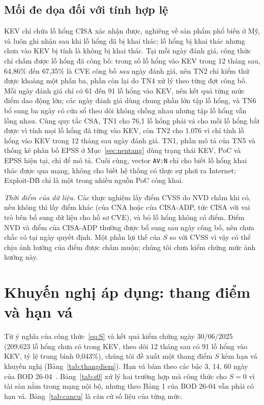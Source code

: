 \documentclass[conference]{IEEEtran}
\begin{document}
\subsection{Mối đe dọa đối với tính hợp lệ}
KEV chỉ chứa lỗ hổng CISA xác nhận được, nghiêng về sản phẩm phổ biến ở Mỹ, và luôn ghi nhận sau khi
lỗ hổng đã bị khai thác; lỗ hổng bị khai thác nhưng chưa vào KEV bị tính là không bị khai thác. Tại
mỗi ngày đánh giá, công thức chỉ chấm được lỗ hổng đã công bố: trong số lỗ hổng vào KEV trong 12
tháng sau, 64,86\% đến 67,35\% là CVE công bố \emph{sau} ngày đánh giá, nên TN2 chỉ kiểm thử được khoảng
một phần ba, phần còn lại do TN4 xử lý theo từng đợt công bố. Mỗi ngày đánh giá chỉ có 61 đến 91 lỗ
hổng vào KEV, nên kết quả từng mức điểm dao động lớn; các ngày đánh giá dùng chung phần lớn tập lỗ
hổng, và TN6 bổ sung ba ngày có cửa sổ theo dõi không chồng nhau nhưng tập lỗ hổng vẫn lồng nhau.
Cùng quy tắc CSA, TN1 cho 76,1 lỗ hổng phải vá cho mỗi lỗ hổng bắt được vì tính mọi lỗ hổng đã từng
vào KEV, còn TN2 cho 1.076 vì chỉ tính lỗ hổng vào KEV trong 12 tháng sau ngày đánh giá. TN1, phần mô
tả của TN5 và thống kê phân bố EPSS ở Mục~\ref{sec:nentang} dùng trạng thái KEV, PoC và EPSS hiện tại, chỉ để mô tả. Cuối
cùng, vector \texttt{AV:N} chỉ cho biết lỗ hổng khai thác được qua mạng, không cho biết hệ thống có
thực sự phơi ra Internet; Exploit-DB chỉ là một trong nhiều nguồn PoC công khai.

\emph{Thời điểm của dữ liệu.} Các thực nghiệm lấy điểm CVSS do NVD chấm khi có, nếu không thì lấy điểm khác (của CNA hoặc của CISA-ADP, tức CISA với vai trò bên bổ sung dữ liệu cho hồ sơ CVE), và bỏ lỗ hổng không có điểm. Điểm NVD và điểm của CISA-ADP thường được bổ sung sau ngày công bố, nên chưa chắc có tại ngày quyết định. Một phần lợi thế của $S$ so với CVSS vì vậy có thể chịu ảnh hưởng của điểm được chấm muộn; chúng tôi chưa kiểm chứng mức ảnh hưởng này.

\section{Khuyến nghị áp dụng: thang điểm và hạn vá}\label{sec:khuyennghi}

Từ ý nghĩa của công thức~\eqref{eq:S} và kết quả kiểm chứng ngày 30/06/2025 (209.623 lỗ hổng chưa có trong KEV,
theo dõi 12 tháng sau có 91 lỗ hổng vào KEV, tỷ lệ trung bình 0,043\%), chúng tôi đề xuất một thang điểm $S$ kèm hạn vá
khuyến nghị (Bảng~\ref{tab:thangdiem}). Hạn vá bám theo các bậc 3, 14, 60 ngày của BOD 26-04~\cite{bod2604}.
Bảng~\ref{tab:s0} xử lý hai trường hợp mà công thức cho $S = 0$ vì tài sản nằm trong mạng nội bộ, nhưng theo Bảng 1
của BOD 26-04 vẫn phải có hạn vá. Bảng~\ref{tab:cancu} là căn cứ số liệu của từng mức.
\end{document}
